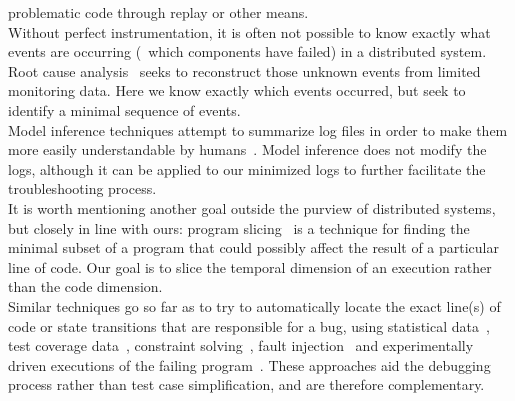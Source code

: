 problematic code through replay or other means.\\[0.5ex]
%
 Without perfect instrumentation,
it is often not possible to know exactly what events are occurring (\eg~which
components have failed) in a
distributed system. Root cause analysis~\cite{yemini1996,Kandula:2009:DDE:1592568.1592597}
seeks to reconstruct those unknown events from limited monitoring data.
Here we know exactly which events occurred, but
seek to identify a minimal sequence of events.\\[0.5ex]
%
 Model inference techniques attempt to summarize log files
in order to make them more easily understandable by
humans~\cite{synoptic,csight,biermann1972synthesis,lorenzoli2008automatic,lou2010mining}.
Model inference does not modify the logs, although
it can be applied to our minimized logs to further facilitate the
troubleshooting process.\\[0.5ex]
%
 It is worth mentioning another goal outside the purview of distributed systems, but
closely in line with ours: program slicing~\cite{weiser1981program} is a
technique for finding the
minimal subset of a program that could possibly affect the result of a particular line of code.
Our goal is to slice the temporal dimension of an execution rather than the
code dimension.\\[0.5ex]
%
 Similar techniques go so far as to try to
automatically locate the exact line(s) of code or state transitions that are responsible for a
bug, using statistical data~\cite{zhangzhang}, test coverage
data~\cite{coverage_localization,xuan14}, constraint solving~\cite{jose11},
fault injection~\cite{zhang13} and
experimentally driven executions of the failing program~\cite{zeller2005,comparative_causality}.
These approaches aid the debugging process rather than test case
simplification,
and are therefore complementary.
